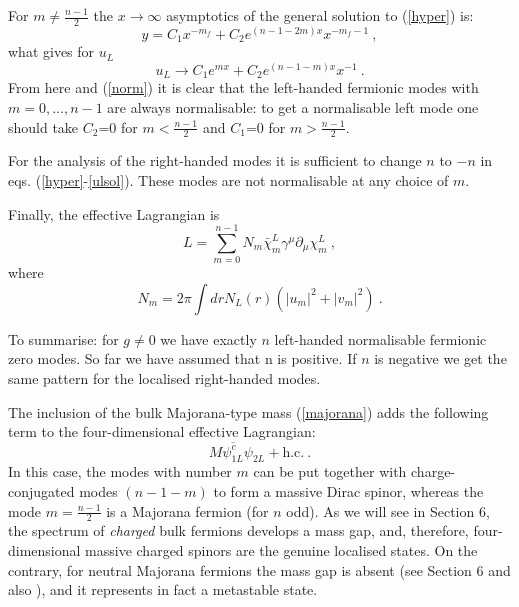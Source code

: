 \documentclass[a4paper,12pt]{article}
\begin{document}
For $m \neq\frac{n-1}{2}$ the $x\rightarrow\infty$ asymptotics of the 
general solution to (\ref{hyper}) is:
\begin{equation}
y=C_1 x^{-m_f}+C_2 e^{(n-1-2m)x}x^{-m_f-1}~,
\end{equation}
what gives for $u_{L}$
\begin{equation}
u_{L} \to C_1 e^{mx} + C_2 e^{(n-1-m)x}x^{-1}~.
\label{ulsol}
\end{equation}
From here and (\ref{norm}) it is clear that the left-handed fermionic
modes with $m=0,\dots,n-1$ are always normalisable: to get a
normalisable left mode one should take $C_2$=0 for $m<\frac{n-1}{2}$
and  $C_1$=0 for $m >\frac{n-1}{2}$. 

For the analysis of the right-handed modes it is sufficient to change
$n$ to $-n$ in eqs. (\ref{hyper}-\ref{ulsol}). These modes are not
normalisable at any choice of $m$. 

Finally, the effective Lagrangian is
\begin{equation}
L= \sum_{m=0}^{n-1} N_m\bar\chi_m^L\gamma^\mu\partial_\mu\chi_m^L~,
\label{ll}
\end{equation}
where
\begin{equation}
N_m = 2 \pi \int dr N_L(r)\left(|u_m|^2+|v_m|^2\right)~.
\label{nm}
\end{equation}

To summarise: for $g\neq 0$ we have exactly $n$ left-handed
normalisable fermionic zero modes.  So far we have assumed that n is
positive. If $n$ is negative we get the same pattern for the
localised right-handed modes.

The inclusion of the bulk Majorana-type mass (\ref{majorana}) adds the
following term to the four-dimensional effective Lagrangian:
\begin{equation}
M {\overline{\psi_{1L}^c}}\psi_{2L} + \mbox{h.c.}~.
\end{equation}
In this case, the modes with number $m$ can be put together with 
charge-conjugated modes $(n-1-m)$ to form a massive Dirac spinor,
whereas the mode $m=\frac{n-1}{2}$ is a Majorana fermion (for $n$
odd). As we will see in Section 6, the spectrum of {\it charged} bulk
fermions develops a mass gap, and, therefore, four-dimensional 
massive charged spinors are the genuine localised states. On the
contrary, for neutral Majorana fermions the mass gap is absent (see
Section 6 and also \cite{Dubovsky:2000am}), and it represents in fact
a metastable state.

\end{document}

